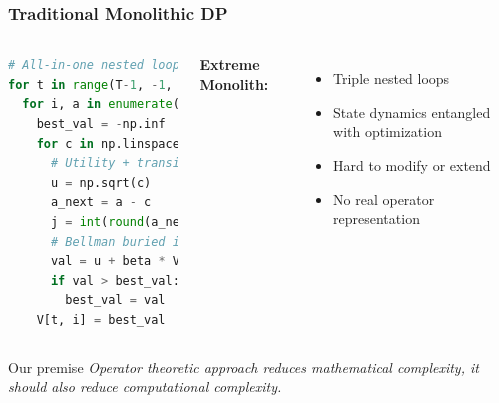 \documentclass[10pt]{beamer}
\begin{document}
\begin{frame}[fragile]
  \frametitle{Traditional Monolithic DP}
  
  \begin{columns}[T]
    \begin{lstlisting}[language=Python,basicstyle=\tiny\ttfamily,numbers=none]
# All-in-one nested loops
for t in range(T-1, -1, -1):
  for i, a in enumerate(asset_grid):
    best_val = -np.inf
    for c in np.linspace(0, a, 101):
      # Utility + transition mixed
      u = np.sqrt(c)
      a_next = a - c
      j = int(round(a_next))
      # Bellman buried in loops
      val = u + beta * V[t+1, j]
      if val > best_val:
        best_val = val
    V[t, i] = best_val
    \end{lstlisting}
    
    \textbf{Extreme Monolith:}
    \begin{itemize}
      \item Triple nested loops
      \item State dynamics entangled with optimization
      \item Hard to modify or extend 
      \item No real operator representation
    \end{itemize}
  \end{columns}
  
  \vspace{0.5em}
  \vspace{0.6em}
  \begin{block}{Our premise}
    \centering
    \textit{Operator theoretic approach \alert{reduces mathematical complexity}, it should also reduce computational complexity.}
  \end{block}
\end{frame}
\end{document}
